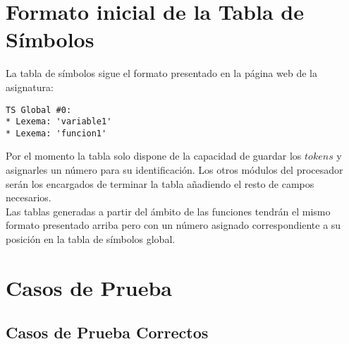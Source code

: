 \documentclass{article}
\begin{document}
\section{Formato inicial de la Tabla de Símbolos}
La tabla de símbolos sigue el formato presentado en la página web de la asignatura:
\begin{center}
\begin{verbatim}
TS Global #0:
* Lexema: 'variable1'
* Lexema: 'funcion1'
\end{verbatim}
\end{center}
Por el momento la tabla solo dispone de la capacidad de guardar los $tokens$ y asignarles un número para su identificación. Los otros módulos del procesador serán los encargados de terminar la tabla añadiendo el resto de campos\\ necesarios. \\
Las tablas generadas a partir del ámbito de las funciones tendrán el mismo formato presentado arriba pero con un número asignado correspondiente a su posición en la tabla de símbolos global.
\section{Casos de Prueba}


\subsection{Casos de Prueba Correctos}
\end{document}
